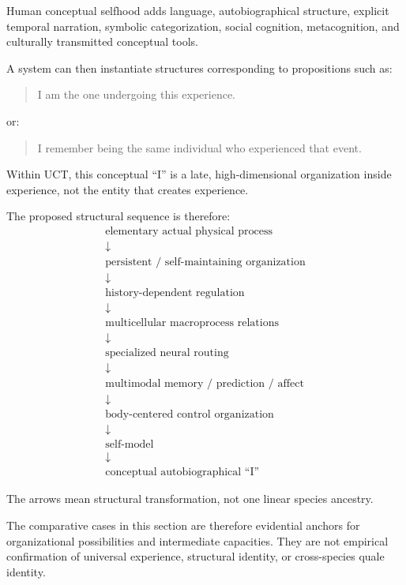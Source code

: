 \documentclass[
  11pt,
  a4paper,
]{article}
\begin{document}
Human conceptual selfhood adds language, autobiographical structure,
explicit temporal narration, symbolic categorization, social cognition,
metacognition, and culturally transmitted conceptual tools.

A system can then instantiate structures corresponding to propositions
such as:

\begin{quote}
I am the one undergoing this experience.
\end{quote}

or:

\begin{quote}
I remember being the same individual who experienced that event.
\end{quote}

Within UCT, this conceptual ``I'' is a late, high-dimensional
organization inside experience, not the entity that creates experience.

The proposed structural sequence is therefore:
\nopagebreak[4]
\[
\boxed{
\begin{array}{c}
\text{elementary actual physical process}\\
\downarrow\\
\text{persistent / self-maintaining organization}\\
\downarrow\\
\text{history-dependent regulation}\\
\downarrow\\
\text{multicellular macroprocess relations}\\
\downarrow\\
\text{specialized neural routing}\\
\downarrow\\
\text{multimodal memory / prediction / affect}\\
\downarrow\\
\text{body-centered control organization}\\
\downarrow\\
\text{self-model}\\
\downarrow\\
\text{conceptual autobiographical “I”}
\end{array}
}
\]

The arrows mean structural transformation, not one linear species
ancestry.

The comparative cases in this section are therefore evidential anchors
for organizational possibilities and intermediate capacities. They are
not empirical confirmation of universal experience, structural identity,
or cross-species quale identity.
\end{document}
